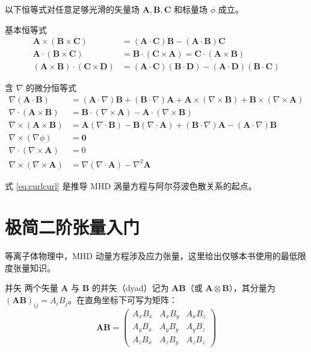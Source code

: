 \documentclass[12pt,a4paper,openany,oneside]{book}
\newcommand{\vect}[1]{\bm{#1}}
\newcommand{\grad}{\nabla}
\newcommand{\curl}{\nabla\times}
\newcommand{\divg}{\nabla\cdot}
\newcommand{\lap}{\nabla^2}
\begin{document}
以下恒等式对任意足够光滑的矢量场 $\vect{A},\vect{B},\vect{C}$ 和标量场 $\phi$ 成立。

\begin{theorem}{基本恒等式}{}{}
\begin{align}
\vect{A}\times(\vect{B}\times\vect{C}) &= (\vect{A}\cdot\vect{C})\vect{B} - (\vect{A}\cdot\vect{B})\vect{C} \label{eq:bac-cab} \\[6pt]
\vect{A}\cdot(\vect{B}\times\vect{C}) &= \vect{B}\cdot(\vect{C}\times\vect{A}) = \vect{C}\cdot(\vect{A}\times\vect{B}) \\[6pt]
(\vect{A}\times\vect{B})\cdot(\vect{C}\times\vect{D}) &= (\vect{A}\cdot\vect{C})(\vect{B}\cdot\vect{D}) - (\vect{A}\cdot\vect{D})(\vect{B}\cdot\vect{C})
\end{align}
\end{theorem}

\begin{theorem}{含 $\nabla$ 的微分恒等式}{}{}
\begin{align}
\grad(\vect{A}\cdot\vect{B}) &= (\vect{A}\cdot\grad)\vect{B} + (\vect{B}\cdot\grad)\vect{A} + \vect{A}\times(\curl\vect{B}) + \vect{B}\times(\curl\vect{A}) \\[6pt]
\divg(\vect{A}\times\vect{B}) &= \vect{B}\cdot(\curl\vect{A}) - \vect{A}\cdot(\curl\vect{B}) \\[6pt]
\curl(\vect{A}\times\vect{B}) &= \vect{A}(\divg\vect{B}) - \vect{B}(\divg\vect{A}) + (\vect{B}\cdot\grad)\vect{A} - (\vect{A}\cdot\grad)\vect{B} \\[6pt]
\curl(\grad\phi) &= \vect{0} \\[6pt]
\divg(\curl\vect{A}) &= 0 \\[6pt]
\curl(\curl\vect{A}) &= \grad(\divg\vect{A}) - \lap\vect{A} \label{eq:curlcurl}
\end{align}
\end{theorem}

式 \eqref{eq:curlcurl} 是推导 MHD 涡量方程与阿尔芬波色散关系的起点。


\section{极简二阶张量入门}

等离子体物理中，MHD 动量方程涉及应力张量，这里给出仅够本书使用的最低限度张量知识。

\begin{definition}{并矢}{}{}
两个矢量 $\vect{A}$ 与 $\vect{B}$ 的并矢（dyad）记为 $\vect{A}\vect{B}$（或 $\vect{A}\otimes\vect{B}$），其分量为 $(\vect{A}\vect{B})_{ij}=A_iB_j$。在直角坐标下可写为矩阵：
\begin{equation}
\vect{A}\vect{B} =
\begin{pmatrix}
A_xB_x & A_xB_y & A_xB_z \\
A_yB_x & A_yB_y & A_yB_z \\
A_zB_x & A_zB_y & A_zB_z
\end{pmatrix}
\end{equation}
\end{definition}
\end{document}
